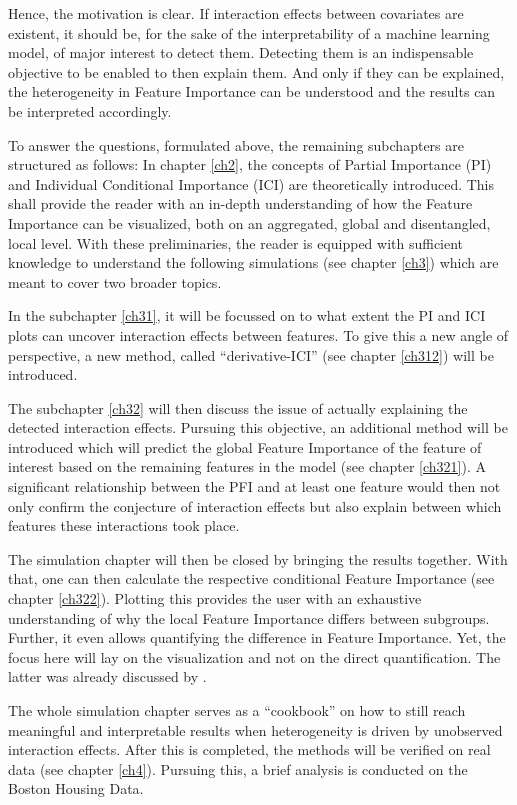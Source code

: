 \documentclass[]{krantz}
\begin{document}
Hence, the motivation is clear. If interaction effects between
covariates are existent, it should be, for the sake of the
interpretability of a machine learning model, of major interest to
detect them. Detecting them is an indispensable objective to be enabled
to then explain them. And only if they can be explained, the
heterogeneity in Feature Importance can be understood and the results
can be interpreted accordingly.

To answer the questions, formulated above, the remaining subchapters are
structured as follows: In chapter \ref{ch2}, the concepts of Partial
Importance (PI) and Individual Conditional Importance (ICI) are
theoretically introduced. This shall provide the reader with an in-depth
understanding of how the Feature Importance can be visualized, both on
an aggregated, global and disentangled, local level. With these
preliminaries, the reader is equipped with sufficient knowledge to
understand the following simulations (see chapter \ref{ch3}) which are
meant to cover two broader topics.

In the subchapter \ref{ch31}, it will be focussed on to what extent the
PI and ICI plots can uncover interaction effects between features. To
give this a new angle of perspective, a new method, called
``derivative-ICI'' (see chapter \ref{ch312}) will be introduced.

The subchapter \ref{ch32} will then discuss the issue of actually
explaining the detected interaction effects. Pursuing this objective, an
additional method will be introduced which will predict the global
Feature Importance of the feature of interest based on the remaining
features in the model (see chapter \ref{ch321}). A significant
relationship between the PFI and at least one feature would then not
only confirm the conjecture of interaction effects but also explain
between which features these interactions took place.

The simulation chapter will then be closed by bringing the results
together. With that, one can then calculate the respective conditional
Feature Importance (see chapter \ref{ch322}). Plotting this provides the
user with an exhaustive understanding of why the local Feature
Importance differs between subgroups. Further, it even allows
quantifying the difference in Feature Importance. Yet, the focus here
will lay on the visualization and not on the direct quantification. The
latter was already discussed by \citet{casalicchio2018visualizing}.

The whole simulation chapter serves as a ``cookbook'' on how to still
reach meaningful and interpretable results when heterogeneity is driven
by unobserved interaction effects. After this is completed, the methods
will be verified on real data (see chapter \ref{ch4}). Pursuing this, a
brief analysis is conducted on the Boston Housing Data.
\end{document}
